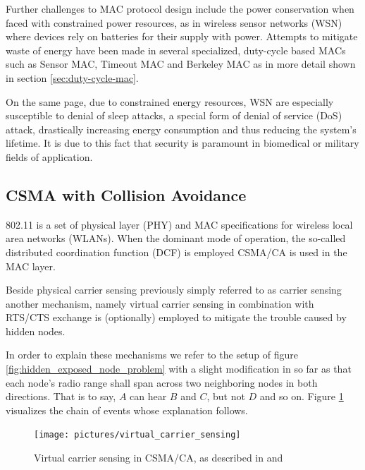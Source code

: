 Further challenges to MAC protocol design include the power conservation when faced with constrained power resources, as in wireless sensor networks (WSN) where devices rely on batteries for their supply with power. Attempts to mitigate waste of energy have been made in several specialized, duty-cycle based MACs such as Sensor MAC, Timeout MAC and Berkeley MAC as in more detail shown in section \ref{sec:duty-cycle-mac}.

On the same page, due to constrained energy resources, WSN are especially susceptible to denial of sleep attacks, a special form of denial of service (DoS) attack, drastically increasing energy consumption and thus reducing the system's lifetime. It is due to this fact that security is paramount in biomedical or military fields of application. 

\subsection{CSMA with Collision Avoidance}

802.11 is a set of physical layer (PHY) and MAC specifications for wireless local area networks (WLANs). When the dominant mode of operation, the so-called distributed coordination function (DCF) is employed CSMA/CA is used in the MAC layer.

Beside physical carrier sensing previously simply referred to as carrier sensing another mechanism, namely virtual carrier sensing in combination with RTS/CTS exchange is (optionally) employed to mitigate the trouble caused by hidden nodes. 

In order to explain these mechanisms we refer to the setup of figure \ref{fig:hidden_exposed_node_problem} with a slight modification in so far as that each node's radio range shall span across two neighboring nodes in both directions. That is to say, $A$ can hear $B$ and $C$, but not $D$ and so on. Figure \ref{fig:virtual_carrier_sensing} visualizes the chain of events whose explanation follows.

\begin{figure}[tb]
	\label{fig:virtual_carrier_sensing}
	\begin{center}
		\texttt{[image: pictures/virtual\_carrier\_sensing]}
	\end{center}
	\caption{Virtual carrier sensing in CSMA/CA, as described in \cite{Tanenbaum02} and \cite{Gast05}}
\end{figure}

